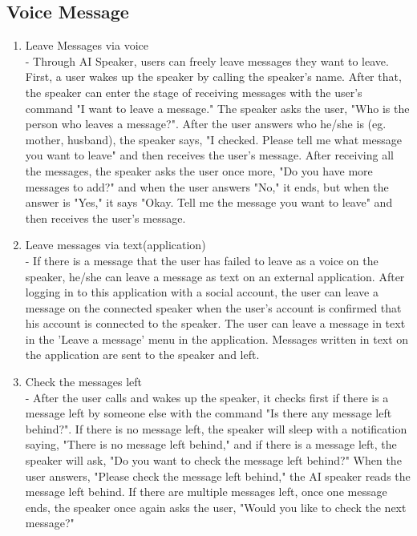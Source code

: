 \documentclass[conference]{IEEEtran}
\begin{document}
\subsection{Voice Message}
\begin{enumerate}
    \item Leave Messages via voice\\
    - Through AI Speaker, users can freely leave messages they want to leave. First, a user wakes up the speaker by calling the speaker's name. After that, the speaker can enter the stage of receiving messages with the user's command "I want to leave a message." The speaker asks the user, "Who is the person who leaves a message?". After the user answers who he/she is (eg. mother, husband), the speaker says, "I checked. Please tell me what message you want to leave" and then receives the user's message. After receiving all the messages, the speaker asks the user once more, "Do you have more messages to add?" and when the user answers "No," it ends, but when the answer is "Yes," it says "Okay. Tell me the message you want to leave" and then receives the user's message.
    \item Leave messages via text(application)\\
    - If there is a message that the user has failed to leave as a voice on the speaker, he/she can leave a message as text on an external application. After logging in to this application with a social account, the user can leave a message on the connected speaker when the user's account is confirmed that his account is connected to the speaker. The user can leave a message in text in the 'Leave a message' menu in the application. Messages written in text on the application are sent to the speaker and left.
    \item Check the messages left\\
    - After the user calls and wakes up the speaker, it checks first if there is a message left by someone else with the command "Is there any message left behind?". If there is no message left, the speaker will sleep with a notification saying, "There is no message left behind," and if there is a message left, the speaker will ask, "Do you want to check the message left behind?" When the user answers, "Please check the message left behind," the AI speaker reads the message left behind. If there are multiple messages left, once one message ends, the speaker once again asks the user, "Would you like to check the next message?"
\end{enumerate}
\end{document}
